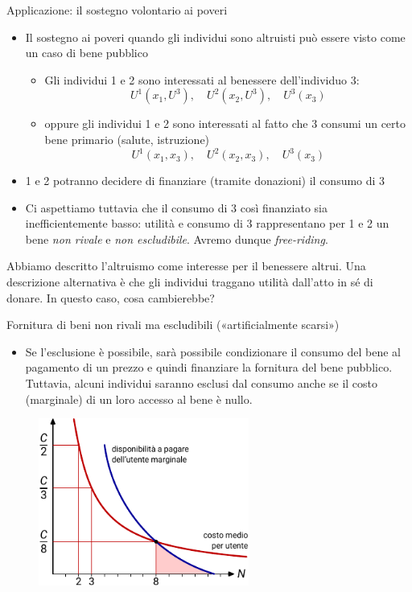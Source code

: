 \documentclass[aspectratio=64,12pt]{beamer}
\begin{document}
\begin{frame}{Applicazione: il sostegno volontario ai poveri}
\begin{itemize}
\item Il sostegno ai poveri quando gli individui sono altruisti può essere visto
come un caso di bene pubblico
\begin{itemize}
  \item Gli individui 1 e 2 sono interessati al benessere dell'individuo 3:
$$U^1(x_1,U^3),\quad U^2(x_2,U^3),\quad U^3(x_3)$$
\item oppure gli individui 1 e 2 sono interessati al fatto che 3 consumi un
  certo bene primario (salute, istruzione)
$$U^1(x_1,x_3),\quad U^2(x_2,x_3),\quad U^3(x_3)$$
\end{itemize}
\item 1 e 2 potranno decidere di finanziare (tramite donazioni) il consumo di 3
\item Ci aspettiamo tuttavia che il consumo di 3 così finanziato sia
inefficientemente basso: utilità e consumo di 3 rappresentano per 1 e 2 un
bene \emph{non rivale} e \emph{non escludibile}. Avremo dunque \emph{free-riding}.
\end{itemize}

\begin{block}{}
Abbiamo descritto l'altruismo come interesse per il benessere altrui.  Una
descrizione alternativa è che gli individui traggano \alert{utilità dall'atto in sé di
donare}.  In questo caso, cosa cambierebbe?
\end{block}
\end{frame}

\begin{frame}{Fornitura di beni non rivali ma escludibili («artificialmente scarsi»)}
\begin{itemize}
\item Se l'esclusione è possibile, sarà possibile condizionare il consumo del bene
al pagamento di un prezzo e quindi finanziare la fornitura del bene
pubblico.  Tuttavia, alcuni individui saranno esclusi dal consumo anche se
il costo (marginale) di un loro accesso al bene è nullo.
\end{itemize}
\begin{figure}[htbp]
\centering
\includegraphics[height=5.5cm]{./figure/beni-pubblici-escludibili-1-color.pdf}
\end{figure}
\end{frame}
\end{document}
